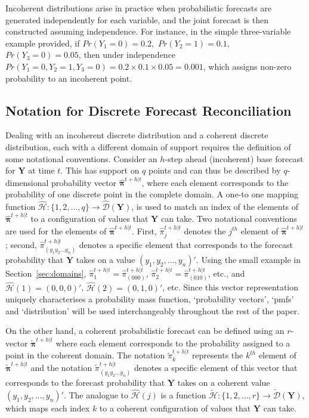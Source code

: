 \documentclass[a4paper,review,12pt,authoryear]{elsarticle}
\newcommand{\bY}{\mathbf{Y}}
\newcommand{\bpi}{\bm{\pi}}
\theoremstyle{definition}
\begin{document}
  Incoherent distributions arise in practice when probabilistic forecasts are generated independently for each variable, and the joint forecast is then constructed assuming independence. For instance, in the simple three-variable example provided, if  $Pr(Y_1=0)=0.2$,~$Pr(Y_2=1)=0.1$,~$Pr(Y_3=0)=0.05$, then under independence $Pr(Y_1=0,Y_2=1,Y_3=0)=0.2\times0.1\times0.05=0.001$, which assigns non-zero probability to an incoherent point.


  \subsection{Notation for Discrete Forecast Reconciliation}

  \label{sec:coherent_df}

  Dealing with an incoherent discrete distribution and a coherent discrete distribution, each with a different domain of support requires the definition of some notational conventions. Consider an $h$-step ahead (incoherent) base forecast for $\bY$ at time $t$. This has support on $q$ points and can thus be described by $q$-dimensional probability vector $\hat{\bpi}^{t+h|t}$, where each element corresponds to the probability of one discrete point in the complete domain. A one-to one mapping function $\hat{\mathcal{H}}:\{1,2,\dots,q\}\rightarrow\hat{\mathcal{D}}(\bY)$, is used to match an index of the elements of $\hat{\bpi}^{t+h|t}$ to a configuration of values that $\bY$ can take. Two notational conventions are used for the elements of $\hat{\bpi}^{t+h|t}$.
  First, $\hat{\pi}_j^{t+h|t}$ denotes the $j^{th}$ element of $\hat{\bpi}^{t+h|t}$;
  second, $\hat{\pi}_{(y_1 y_2 \dots y_n)}^{t+h|t}$ denotes a specific element that corresponds to the forecast probability that $\bY$ takes on a value $(y_1,y_2,\dots,y_n)'$. 
  Using the small example in Section~\ref{sec:domains}, $\hat{\pi}_1^{t+h|t}=\hat{\pi}_{(000)}^{t+h|t}$, $\hat{\pi}_2^{t+h|t}=\hat{\pi}_{(010)}^{t+h|t}$, etc., and $\hat{\mathcal{H}}(1)=(0,0,0)'$, $\hat{\mathcal{H}}(2)=(0,1,0)'$, etc. Since this vector representation uniquely characterises a probability mass function, `probability vectors', `pmfs' and `distribution' will be used interchangeably throughout the rest of the paper.


  On the other hand, a coherent probabilistic forecast can be defined using an $r$-vector $\tilde{\bpi}^{t+h|t}$ where each element corresponds to the probability assigned to a point in the coherent domain.
  The notation $\tilde{\pi}_k^{t+h|t}$ represents the $k^{th}$ element of $\tilde{\bpi}^{t+h|t}$ and the notation $\tilde{\pi}_{(y_1 y_2 \dots y_n)}^{t+h|t}$ denotes a specific element of this vector that corresponds to the forecast probability that $\bY$ takes on a coherent value $(y_1,y_2,\dots,y_n)'$.
  The analogue to $\hat{\mathcal{H}}(j)$ is a function  $\tilde{\mathcal{H}}:\{1,2,\dots,r\}\rightarrow\tilde{\mathcal{D}}(\bY)$, which maps each index $k$ to a coherent configuration of values that $\bY$ can take.
\end{document}
